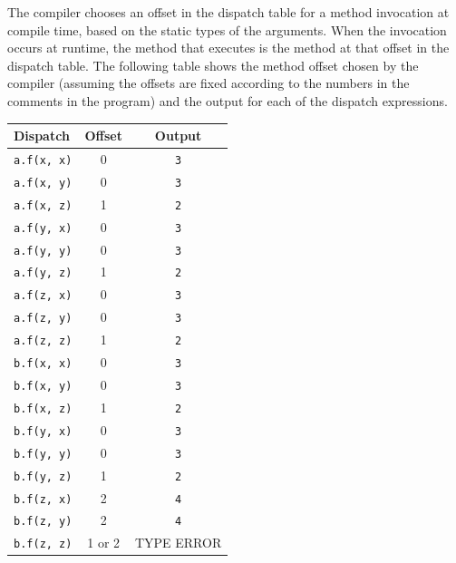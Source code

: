 \documentclass[11pt]{article}
\begin{document}
\begin{enumerate}
The compiler chooses an offset in the dispatch table for a method
invocation at compile time, based on the static types of the
arguments.  When the invocation occurs at runtime, the method that
executes is the method at that offset in the dispatch table.  The
following table shows the method offset chosen by the compiler
(assuming the offsets are fixed according to the numbers in the
comments in the program) and the output for each of the dispatch
expressions.
\begin{center}
\begin{tabular*}{0.5\textwidth}{@{\extracolsep{\fill}}lcc}
Dispatch & Offset & Output \\
\hline
\texttt{a.f(x, x)} & 0 & \texttt{3} \\
\texttt{a.f(x, y)} & 0 & \texttt{3} \\
\texttt{a.f(x, z)} & 1 & \texttt{2} \\
\texttt{a.f(y, x)} & 0 & \texttt{3} \\
\texttt{a.f(y, y)} & 0 & \texttt{3} \\
\texttt{a.f(y, z)} & 1 & \texttt{2} \\
\texttt{a.f(z, x)} & 0 & \texttt{3} \\
\texttt{a.f(z, y)} & 0 & \texttt{3} \\
\texttt{a.f(z, z)} & 1 & \texttt{2} \\
\texttt{b.f(x, x)} & 0 & \texttt{3} \\
\texttt{b.f(x, y)} & 0 & \texttt{3} \\
\texttt{b.f(x, z)} & 1 & \texttt{2} \\
\texttt{b.f(y, x)} & 0 & \texttt{3} \\
\texttt{b.f(y, y)} & 0 & \texttt{3} \\
\texttt{b.f(y, z)} & 1 & \texttt{2} \\
\texttt{b.f(z, x)} & 2 & \texttt{4} \\
\texttt{b.f(z, y)} & 2 & \texttt{4} \\
\texttt{b.f(z, z)} & 1 or 2 & TYPE ERROR
\end{tabular*}
\end{center}

\end{enumerate}
\end{document}

